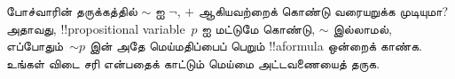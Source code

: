 \documentclass[../../../include/open-logic-section]{subfiles}
\begin{document}
\begin{prob}
  போச்வாரின் தருக்கத்தில் $\sim$ ஐ $\lnot$, $+$ ஆகியவற்றைக் கொண்டு
  வரையறுக்க முடியுமா? அதாவது, !!{propositional variable}~$p$ ஐ மட்டுமே
  கொண்டு, $\sim$ இல்லாமல், எப்போதும்~$\mathord{\sim}p$ இன் அதே
  மெய்மதிப்பைப் பெறும் !!a{formula} ஒன்றைக் காண்க. உங்கள் விடை சரி என்பதைக்
  காட்டும் மெய்மை அட்டவணையைத் தருக.
\end{prob}
\end{document}
